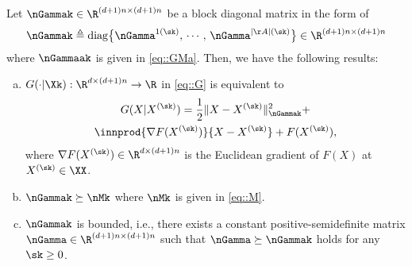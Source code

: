  \begin{lemma}\label{lemma::G}
Let  $\nGammak \in \R^{(d+1)n\times (d+1)n}$ be a block diagonal matrix in the form of
 \begin{equation}\label{eq::nG}
 	\nGammak\triangleq\mathrm{diag}\big\{\nGamma^{1(\sk)},\,\cdots,\,\nGamma^{|\AA|(\sk)}\big\}\in \R^{(d+1)n\times (d+1)n}
 \end{equation}
where $\nGammaak$ is given in \cref{eq::GMa}. Then, we have the following results:
\begin{enumerate}[(a)]
\item\label{lemma::Ga} $G(\cdot|\Xk): \R^{d\times(d+1)n}\rightarrow\R$ in \cref{eq::G} is equivalent to
\begin{multline}\label{eq::GM}
	G(X|X^{(\sk)})
	=\frac{1}{2}\|X-X^{(\sk)}\|_{\nGammak}^2+\\
	\innprod{\nabla F(X^{(\sk)})}{{X-X^{(\sk)}}}+ F(X^{(\sk)}),
\end{multline}
where  $\nabla F(X^{(\sk)})\in \R^{d\times(d+1)n}$ is the Euclidean gradient of $F(X)$ at $X^{(\sk)}\in\XX$.
\item\label{lemma::Gb} $\nGammak\succeq\nMk$ where $\nMk$ is given in \cref{eq::M}. 
\item\label{lemma::Gc}$\nGammak$ is bounded, i.e.,  there exists a constant positive-semidefinite matrix $\nGamma\in \R^{(d+1)n\times (d+1)n}$ such that $\nGamma\succeq \nGammak$ holds for any $\sk\geq 0$. 
\end{enumerate}
 \end{lemma}

